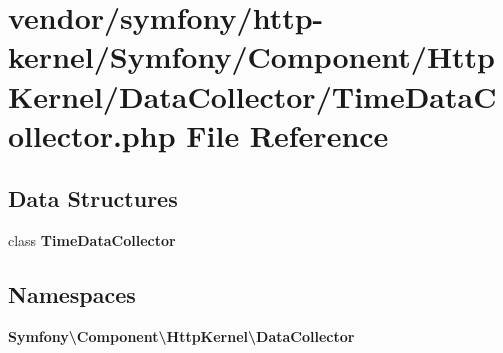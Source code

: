 \section{vendor/symfony/http-\/kernel/\+Symfony/\+Component/\+Http\+Kernel/\+Data\+Collector/\+Time\+Data\+Collector.php File Reference}
\label{_time_data_collector_8php}
\subsection*{Data Structures}
\begin{DoxyCompactItemize}
\item 
class {\bf Time\+Data\+Collector}
\end{DoxyCompactItemize}
\subsection*{Namespaces}
\begin{DoxyCompactItemize}
\item 
 {\bf Symfony\textbackslash{}\+Component\textbackslash{}\+Http\+Kernel\textbackslash{}\+Data\+Collector}
\end{DoxyCompactItemize}
